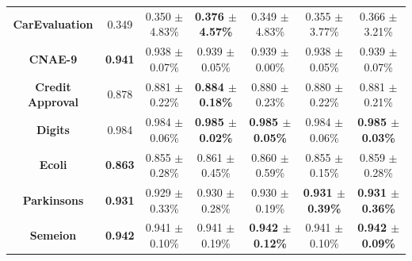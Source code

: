 \documentclass[preprint,12pt]{elsarticle}
\begin{document}
\begin{table}
{\begin{tabular}{ccccccc}
\textbf{CarEvaluation}          & 0.349                                 & 0.350 $\pm$ 4.83\%                                 & {\color[HTML]{FE0000} \textbf{0.376 $\pm$ 4.57\%}} & 0.349 $\pm$ 4.83\%                                 & 0.355 $\pm$ 3.77\%                                 & 0.366 $\pm$ 3.21\%                                 \\
\textbf{CNAE-9}                 & {\color[HTML]{FE0000} \textbf{0.941}} & 0.938 $\pm$ 0.07\%                                 & 0.939 $\pm$ 0.05\%                                 & 0.939 $\pm$ 0.00\%                                 & 0.938 $\pm$ 0.05\%                                 & 0.939 $\pm$ 0.07\%                                 \\
\textbf{Credit   Approval}      & 0.878                                 & 0.881 $\pm$ 0.22\%                                 & {\color[HTML]{FE0000} \textbf{0.884 $\pm$ 0.18\%}} & 0.880 $\pm$ 0.23\%                                 & 0.880 $\pm$ 0.22\%                                 & 0.881 $\pm$ 0.21\%                                 \\
\textbf{Digits}                 & 0.984                                 & 0.984 $\pm$ 0.06\%                                 & {\color[HTML]{FE0000} \textbf{0.985 $\pm$ 0.02\%}} & \textbf{0.985 $\pm$ 0.05\%}                        & 0.984 $\pm$ 0.06\%                                 & \textbf{0.985 $\pm$ 0.03\%}                        \\
\textbf{Ecoli}                  & {\color[HTML]{FE0000} \textbf{0.863}} & 0.855 $\pm$ 0.28\%                                 & 0.861 $\pm$ 0.45\%                                 & 0.860 $\pm$ 0.59\%                                 & 0.855 $\pm$ 0.15\%                                 & 0.859 $\pm$ 0.28\%                                 \\
\textbf{Parkinsons}             & {\color[HTML]{FE0000} \textbf{0.931}} & 0.929 $\pm$ 0.33\%                                 & 0.930 $\pm$ 0.28\%                                 & 0.930 $\pm$ 0.19\%                                 & \textbf{0.931 $\pm$ 0.39\%}                        & \textbf{0.931 $\pm$ 0.36\%}                        \\
\textbf{Semeion}                & {\color[HTML]{FE0000} \textbf{0.942}} & 0.941 $\pm$ 0.10\%                                 & 0.941 $\pm$ 0.19\%                                 & \textbf{0.942 $\pm$ 0.12\%}                        & 0.941 $\pm$ 0.10\%                                 & \textbf{0.942 $\pm$ 0.09\%}                        \\

\end{tabular}}
\end{table}
\end{document}
